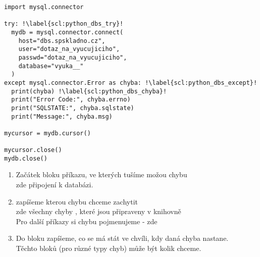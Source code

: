 \begin{minipage}[t]{.45\textwidth}
\begin{code}
\begin{verbatim}
import mysql.connector 

try: !\label{scl:python_dbs_try}!
  mydb = mysql.connector.connect( 
    host="dbs.spskladno.cz",
  	user="dotaz_na_vyucujiciho",
  	passwd="dotaz_na_vyucujiciho",
  	database="vyuka__"
  )
except mysql.connector.Error as chyba: !\label{scl:python_dbs_except}!
  print(chyba) !\label{scl:python_dbs_chyba}!
  print("Error Code:", chyba.errno)
  print("SQLSTATE:", chyba.sqlstate)
  print("Message:", chyba.msg)

mycursor = mydb.cursor() 

mycursor.close() 
mydb.close()
\end{verbatim}

\label{code:python_dbs_try-except}
\end{code}
\end{minipage}
\begin{minipage}[t]{.45\textwidth}
\begin{enumerate}
\item[ř. \ref{scl:python_dbs_try}:] Začátek bloku příkazu, ve kterých tušíme možou chybu\\zde připojení k databázi.
\item[ř. \ref{scl:python_dbs_except}:] zapíšeme kterou chybu chceme zachytit\\zde všechny chyby , které jsou připraveny v knihovně \\Pro další příkazy si chybu pojmenujeme - zde 
\item[ř. \ref{scl:python_dbs_chyba}:] Do bloku  zapíšeme, co se má stát ve chvíli, kdy daná chyba nastane.\\
Těchto bloků (pro různé typy chyb) může být kolik chceme.
\end{enumerate}
\end{minipage}

